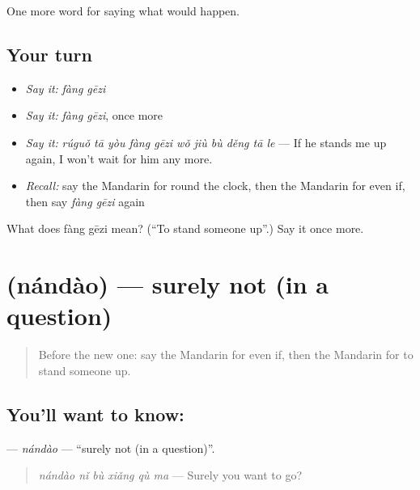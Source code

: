 \begin{grammarlens}[title={What you've built}]
One more word for saying what would happen.
\end{grammarlens}

\subsection*{Your turn}
\begin{itemize}
\raggedright
  \item \emph{Say it:} \emph{fàng gēzi}
  \item \emph{Say it:} \emph{fàng gēzi}, once more
  \item \emph{Say it:} \emph{rúguǒ tā yòu fàng gēzi wǒ jiù bù děng tā le} — If he stands me up again, I won't wait for him any more.
  \item \emph{Recall:} say the Mandarin for round the clock, then the Mandarin for even if, then say \emph{fàng gēzi} again
\end{itemize}

\begin{tcolorbox}[breakable,colback=teal!4,colframe=teal!35!black,title={Before you move on}]
What does fàng gēzi mean? (\textquotedblleft{}To stand someone up\textquotedblright{}.) Say it once more.
\end{tcolorbox}
\section[\texorpdfstring{\zh{难道} (nándào)}{难道 (nándào)}]{ (nándào) — surely not (in a question)}

\label{lesson:ZH-C397-nandao}



\begin{quote}
Before the new one: say the Mandarin for even if, then the Mandarin for to stand someone up.
\end{quote}

\subsection*{You'll want to know: }
\textbf{} — \emph{nándào} — \textquotedblleft{}surely not (in a question)\textquotedblright{}.

\begin{quote}
\textbf{} \emph{nándào nǐ bù xiǎng qù ma} — Surely you want to go?
\end{quote}

